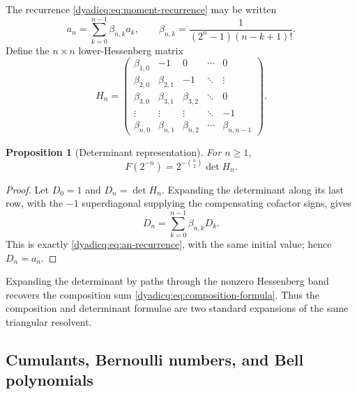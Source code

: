 \documentclass[11pt,oneside]{article}
\newtheorem{proposition}[theorem]{Proposition}
\theoremstyle{definition}
\theoremstyle{remark}
\begin{document}
The recurrence \eqref{dyadicq:eq:moment-recurrence} may be written
\begin{equation}\label{dyadicq:eq:an-recurrence}
 a_n=\sum_{k=0}^{n-1}\beta_{n,k}a_k,
 \qquad
 \beta_{n,k}=\frac1{(2^n-1)(n-k+1)!}.
\end{equation}
Define the $n\times n$ lower-Hessenberg matrix
\begin{equation}\label{dyadicq:eq:Hn-matrix}
 H_n=
 \begin{pmatrix}
 \beta_{1,0}&-1&0&\cdots&0\\
 \beta_{2,0}&\beta_{2,1}&-1&\ddots&\vdots\\
 \beta_{3,0}&\beta_{3,1}&\beta_{3,2}&\ddots&0\\
 \vdots&\vdots&\vdots&\ddots&-1\\
 \beta_{n,0}&\beta_{n,1}&\beta_{n,2}&\cdots&\beta_{n,n-1}
 \end{pmatrix}.
\end{equation}

\begin{proposition}[Determinant representation]\label{dyadicq:prop:determinant}
For $n\ge1$,
\begin{equation}\label{dyadicq:eq:determinant-formula}
 \boxed{
  F(2^{-n})=2^{-\binom n2}\det H_n.}
\end{equation}
\end{proposition}

\begin{proof}
Let $D_0=1$ and $D_n=\det H_n$.  Expanding the determinant along its last row,
with the $-1$ superdiagonal supplying the compensating cofactor signs, gives
\[
 D_n=\sum_{k=0}^{n-1}\beta_{n,k}D_k.
\]
This is exactly \eqref{dyadicq:eq:an-recurrence}, with the same initial value; hence
$D_n=a_n$.
\end{proof}

Expanding the determinant by paths through the nonzero Hessenberg band
recovers the composition sum \eqref{dyadicq:eq:composition-formula}.  Thus the
composition and determinant formulae are two standard expansions of the same
triangular resolvent.

\subsection{Cumulants, Bernoulli numbers, and Bell polynomials}
\end{document}

